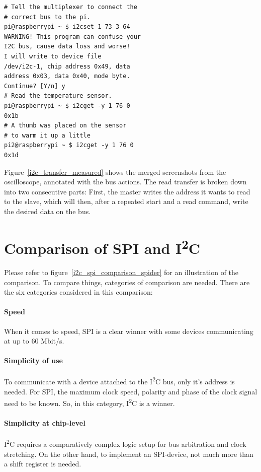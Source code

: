 \documentclass[journal]{IEEEtran}
\makeatletter
\newcommand{\twi}{I\textsuperscript{2}C\xspace}
\renewcommand{\ss}{\texttt{\textoverline{SS}}\xspace}
\newcommand*{\textoverline}[1]{$\overline{\hbox{#1}}\m@th$}
\makeatother
\begin{document}
\begin{verbatim}
# Tell the multiplexer to connect the
# correct bus to the pi.
pi@raspberrypi ~ $ i2cset 1 73 3 64
WARNING! This program can confuse your
I2C bus, cause data loss and worse!
I will write to device file
/dev/i2c-1, chip address 0x49, data
address 0x03, data 0x40, mode byte.
Continue? [Y/n] y
# Read the temperature sensor.
pi@raspberrypi ~ $ i2cget -y 1 76 0
0x1b
# A thumb was placed on the sensor
# to warm it up a little
pi2@raspberrypi ~ $ i2cget -y 1 76 0
0x1d
\end{verbatim}

Figure~\ref{i2c_transfer_measured} shows the merged screenshots from the oscilloscope, annotated with the bus actions. The read transfer is broken down into two consecutive parts: First, the master writes the address it wants to read to the slave, which will then, after a repeated start and a read command, write the desired data on the bus.




\section{Comparison of SPI and \twi}
Please refer to figure~\ref{i2c_spi_comparison_spider} for an illustration of the comparison.
To compare things, categories of comparison are needed. There are the six categories considered in this comparison:

\paragraph*{Speed}
When it comes to speed, SPI is a clear winner with some devices communicating at up to 60 Mbit/s.%

\paragraph*{Simplicity of use}
To communicate with a device attached to the \twi bus, only it's address is needed. For SPI, the maximum clock speed, polarity and phase of the clock signal need to be known.
So, in this category, \twi is a winner.

\paragraph*{Simplicity at chip-level}
\twi requires a comparatively complex logic setup for bus arbitration and clock stretching. On the other hand, to implement an SPI-device, not much more than a shift register is needed.
\end{document}
